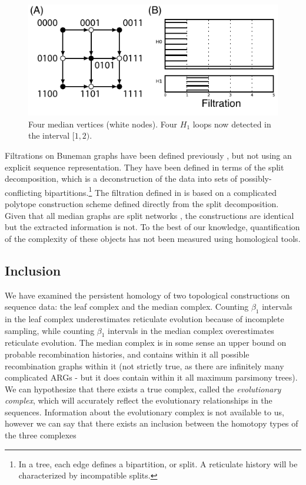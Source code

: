 \begin{figure}
\centering
\includegraphics[width=\columnwidth]{fig/complex_construction/example_2_revisited.pdf}
\caption{Four median vertices (white nodes). Four $H_1$ loops now detected in the interval $[1,2)$.}
\label{fig:example_2_revisited}
\end{figure}

Filtrations on Buneman graphs have been defined previously \citep{Dress:1997}, but not using an explicit sequence representation.
They have been defined in terms of the split decomposition, which is a deconstruction of the data into sets of possibly-conflicting bipartitions.\footnote{In a tree, each edge defines a bipartition, or split. A reticulate history will be characterized by incompatible splits.}
The filtration defined in \citet{Dress:1997} is based on a complicated polytope construction scheme defined directly from the split decomposition.
Given that all median graphs are split networks \citep{Huson:2010}, the constructions are identical but the extracted information is not.
To the best of our knowledge, quantification of the complexity of these objects has not been measured using homological tools.

\subsection{Inclusion}
%
We have examined the persistent homology of two topological constructions on sequence data: the leaf complex and the median complex.
Counting $\beta_1$ intervals in the leaf complex underestimates reticulate evolution because of incomplete sampling, while counting $\beta_1$ intervals in the median complex overestimates reticulate evolution.
The median complex is in some sense an upper bound on probable recombination histories, and contains within it all possible recombination graphs within it (not strictly true, as there are infinitely many complicated ARGs - but it does contain within it all maximum parsimony trees).
We can hypothesize that there exists a true complex, called the \emph{evolutionary complex}, which will accurately reflect the evolutionary relationships in the sequences.
Information about the evolutionary complex is not available to us, however we can say that there exists an inclusion between the homotopy types of the three complexes

